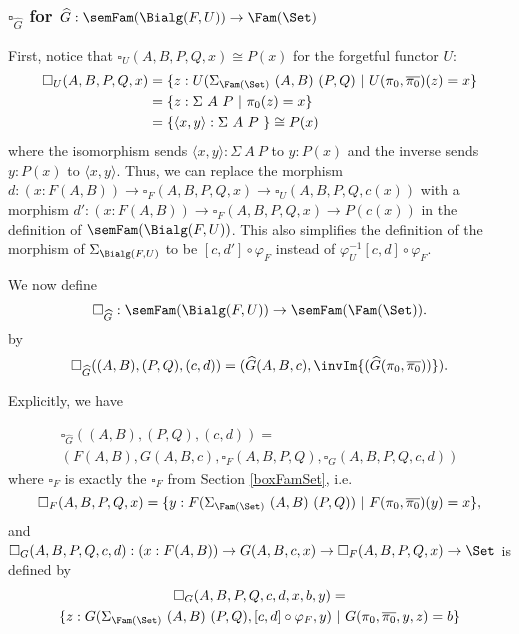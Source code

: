 \documentclass{article}
\begin{document}

\subsubsection{$\square_{\widehat{G}}$ for $\widehat{G} : \semFam(\Bialg(F, U)) \to \Fam(\Set)$}

First, notice that $\square_U(A, B, P, Q, x) \cong P(x)$ for the forgetful functor $U$:
\begin{align*}
\square_U(A, B, P, Q, x)
&= \{ z : U(\Sigma_{\Fam(\Set)}\ (A, B)\ (P, Q)\ |\ U(\pi_0, \overline{\pi_0})(z) = x\} \\
&= \{ z : \Sigma\ A\ P\ |\ \pi_0(z) = x\} \\
&= \{ \langle x, y\rangle : \Sigma\ A\ P\ \} \cong P(x)
\end{align*}
where the isomorphism sends $\langle x, y\rangle : \Sigma\ A\ P$ to $y
: P(x)$ and the inverse sends $y : P(x)$ to $\langle x,
y\rangle$. Thus, we can replace the morphism $d : (x : F(A, B)) \to
\square_F(A, B, P, Q, x) \to \square_U(A, B, P, Q, c(x))$ with a
morphism $d' : (x : F(A, B)) \to \square_F(A, B, P, Q, x) \to P(c(x))$
in the definition of $\semFam(\Bialg(F, U))$. This also simplifies the
definition of the morphism of $\Sigma_{\Bialg(F, U)}$ to be $[c, d']
\circ \varphi_F$ instead of $\varphi^{-1}_U [c, d] \circ \varphi_F$.

We now define
\[
\square_{\widehat{G}} : \semFam(\Bialg(F, U)) \to \semFam(\Fam(\Set)).
\]
by
\[
  \square_{\widehat{G}}((A, B), (P, Q), (c, d)) =
  (\widehat{G}(A, B, c), \invIm{(\widehat{G}(\pi_0, \overline{\pi_0}))}).
\]

Explicitly, we have 

\begin{multline*}
    \square_{\widehat{G}}((A, B), (P, Q), (c, d)) = \\
  (F(A, B), G(A, B, c), \square_F(A, B, P, Q), \square_G(A, B, P, Q, c, d))
\end{multline*}
where $\square_F$ is exactly the $\square_F$ from Section
\ref{boxFamSet}, i.e.
\[
\square_F(A, B, P, Q, x) =
\{ y : F(\Sigma_{\Fam(\Set)}\ (A, B)\ (P, Q))\ |\ F(\pi_0, \overline{\pi_0})(y) = x\},
\]
and $\square_G(A, B, P, Q, c, d) : (x : F(A, B)) \to G(A, B, c, x) \to \square_F(A, B, P,
Q, x) \to \Set$ is defined by
\begin{multline*}
\square_G(A, B, P, Q, c, d, x, b, y) = \\
  \{ z : G(\Sigma_{\Fam(\Set)}\ (A, B)\ (P, Q), [c, d] \circ \varphi_F, y)\ |\ G(\pi_0, \overline{\pi_0}, y, z) = b \}
\end{multline*}
\end{document}
